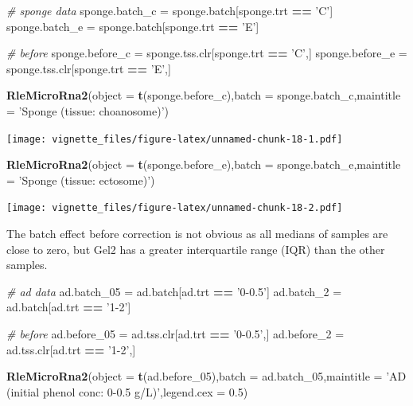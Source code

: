 \documentclass[]{book}
\newenvironment{Shaded}{\begin{snugshade}}{\end{snugshade}}
\newcommand{\KeywordTok}[1]{\textcolor[rgb]{0.13,0.29,0.53}{\textbf{#1}}}
\newcommand{\DataTypeTok}[1]{\textcolor[rgb]{0.13,0.29,0.53}{#1}}
\newcommand{\DecValTok}[1]{\textcolor[rgb]{0.00,0.00,0.81}{#1}}
\newcommand{\FloatTok}[1]{\textcolor[rgb]{0.00,0.00,0.81}{#1}}
\newcommand{\StringTok}[1]{\textcolor[rgb]{0.31,0.60,0.02}{#1}}
\newcommand{\CommentTok}[1]{\textcolor[rgb]{0.56,0.35,0.01}{\textit{#1}}}
\newcommand{\OperatorTok}[1]{\textcolor[rgb]{0.81,0.36,0.00}{\textbf{#1}}}
\newcommand{\NormalTok}[1]{#1}
\begin{document}
\begin{Shaded}
\begin{Highlighting}[]
\CommentTok{# sponge data}
\NormalTok{sponge.batch_c =}\StringTok{ }\NormalTok{sponge.batch[sponge.trt }\OperatorTok{==}\StringTok{ 'C'}\NormalTok{]}
\NormalTok{sponge.batch_e =}\StringTok{ }\NormalTok{sponge.batch[sponge.trt }\OperatorTok{==}\StringTok{ 'E'}\NormalTok{] }

\CommentTok{# before}
\NormalTok{sponge.before_c =}\StringTok{ }\NormalTok{sponge.tss.clr[sponge.trt }\OperatorTok{==}\StringTok{ 'C'}\NormalTok{,]}
\NormalTok{sponge.before_e =}\StringTok{ }\NormalTok{sponge.tss.clr[sponge.trt }\OperatorTok{==}\StringTok{ 'E'}\NormalTok{,] }


\KeywordTok{RleMicroRna2}\NormalTok{(}\DataTypeTok{object =} \KeywordTok{t}\NormalTok{(sponge.before_c),}\DataTypeTok{batch =}\NormalTok{ sponge.batch_c,}\DataTypeTok{maintitle =} \StringTok{'Sponge (tissue: choanosome)'}\NormalTok{)}
\end{Highlighting}
\end{Shaded}

\texttt{[image: vignette\_files/figure-latex/unnamed-chunk-18-1.pdf]}

\begin{Shaded}
\begin{Highlighting}[]
\KeywordTok{RleMicroRna2}\NormalTok{(}\DataTypeTok{object =} \KeywordTok{t}\NormalTok{(sponge.before_e),}\DataTypeTok{batch =}\NormalTok{ sponge.batch_e,}\DataTypeTok{maintitle =} \StringTok{'Sponge (tissue: ectosome)'}\NormalTok{)}
\end{Highlighting}
\end{Shaded}

\texttt{[image: vignette\_files/figure-latex/unnamed-chunk-18-2.pdf]}

The batch effect before correction is not obvious as all medians of
samples are close to zero, but Gel2 has a greater interquartile range
(IQR) than the other samples.

\begin{Shaded}
\begin{Highlighting}[]
\CommentTok{# ad data}
\NormalTok{ad.batch_}\DecValTok{05}\NormalTok{ =}\StringTok{ }\NormalTok{ad.batch[ad.trt }\OperatorTok{==}\StringTok{ '0-0.5'}\NormalTok{]}
\NormalTok{ad.batch_}\DecValTok{2}\NormalTok{ =}\StringTok{ }\NormalTok{ad.batch[ad.trt }\OperatorTok{==}\StringTok{ '1-2'}\NormalTok{] }

\CommentTok{# before}
\NormalTok{ad.before_}\DecValTok{05}\NormalTok{ =}\StringTok{ }\NormalTok{ad.tss.clr[ad.trt }\OperatorTok{==}\StringTok{ '0-0.5'}\NormalTok{,]}
\NormalTok{ad.before_}\DecValTok{2}\NormalTok{ =}\StringTok{ }\NormalTok{ad.tss.clr[ad.trt }\OperatorTok{==}\StringTok{ '1-2'}\NormalTok{,]}

\KeywordTok{RleMicroRna2}\NormalTok{(}\DataTypeTok{object =} \KeywordTok{t}\NormalTok{(ad.before_}\DecValTok{05}\NormalTok{),}\DataTypeTok{batch =}\NormalTok{ ad.batch_}\DecValTok{05}\NormalTok{,}\DataTypeTok{maintitle =} \StringTok{'AD (initial phenol conc: 0-0.5 g/L)'}\NormalTok{,}\DataTypeTok{legend.cex =} \FloatTok{0.5}\NormalTok{)}
\end{Highlighting}
\end{Shaded}
\end{document}
